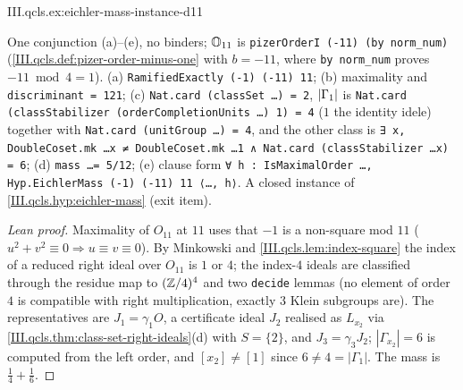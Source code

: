 \begin{example}[Pizer's order for $D=11$]
\end{example}
\begin{tfformal}{III.qcls.ex:eichler-mass-instance-d11}
\begin{tffidelity}
One conjunction (a)--(e), no binders; $\mathbb{O}_{11}$ is \texttt{pizerOrderI (-11) (by norm\_num)} (\cref{III.qcls.def:pizer-order-minus-one} with $b=-11$, where \texttt{by norm\_num} proves $-11\bmod4=1$). (a) \texttt{RamifiedExactly (-1) (-11) 11}; (b) maximality and \texttt{discriminant = 121}; (c) \texttt{Nat.card (classSet \dots) = 2}, $\lvert\Gamma_1\rvert$ is \texttt{Nat.card (classStabilizer (orderCompletionUnits \dots) 1) = 4} ($1$ the identity idele) together with \texttt{Nat.card (unitGroup \dots) = 4}, and the other class is \texttt{∃ x, DoubleCoset.mk \dots x ≠ DoubleCoset.mk \dots 1 ∧ Nat.card (classStabilizer \dots x) = 6}; (d) \texttt{mass \dots = 5/12}; (e) clause form \texttt{∀ h : IsMaximalOrder \dots, Hyp.EichlerMass (-1) (-11) 11 ⟨\dots, h⟩}. A closed instance of \cref{III.qcls.hyp:eichler-mass} (exit item).
\end{tffidelity}
\end{tfformal}
\begin{proof}[Lean proof]
Maximality of $O_{11}$ at $11$ uses that $-1$ is a non-square mod $11$ ($u^2+v^2\equiv0\Rightarrow u\equiv v\equiv0$). By Minkowski and \cref{III.qcls.lem:index-square} the index of a reduced right ideal over $O_{11}$ is $1$ or $4$; the index-$4$ ideals are classified through the residue map to $(\mathbb{Z}/4)^4$ and two \texttt{decide} lemmas (no element of order $4$ is compatible with right multiplication, exactly $3$ Klein subgroups are). The representatives are $J_1=\gamma_1O$, a certificate ideal $J_2$ realised as $L_{x_2}$ via \cref{III.qcls.thm:class-set-right-ideals}(d) with $S=\{2\}$, and $J_3=\gamma_3J_2$; $|\Gamma_{x_2}|=6$ is computed from the left order, and $[x_2]\neq[1]$ since $6\neq4=|\Gamma_1|$. The mass is $\frac14+\frac16$.
\end{proof}

